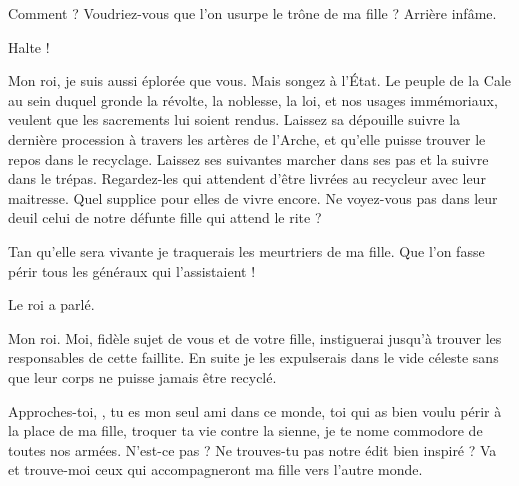 \begin{drama}
  \roispeaks Comment ? Voudriez-vous que l’on usurpe le trône de ma fille ? Arrière infâme.

  \kingsgardsspeaks {} Halte !

  \reinespeaks Mon roi, je suis aussi éplorée que vous. Mais songez à l’État. Le peuple de la Cale au sein duquel gronde la révolte, la noblesse, la loi, et nos usages immémoriaux, veulent que les sacrements lui soient rendus. Laissez sa dépouille suivre la dernière procession à travers les artères de l’Arche, et qu’elle puisse trouver le repos dans le recyclage. Laissez ses suivantes marcher dans ses pas et la suivre dans le trépas.
  Regardez-les qui attendent d’être livrées au recycleur avec leur maitresse. Quel supplice pour elles de vivre encore. Ne voyez-vous pas dans leur deuil celui de notre défunte fille qui attend le rite ?

  \roispeaks Tan qu’elle sera vivante je traquerais les meurtriers de ma fille. Que l’on fasse périr tous les généraux qui l’assistaient !

  \kingsgardsspeaks Le roi a parlé.

  \generalspeaks Mon roi. Moi, fidèle sujet de vous et de votre fille, instiguerai jusqu’à trouver les responsables de cette faillite. En suite je les expulserais dans le vide céleste sans que leur corps ne puisse jamais être recyclé.

  \roispeaks Approches-toi, \general, tu es mon seul ami dans ce monde,  toi qui as bien voulu périr à la place de ma fille, troquer ta vie contre la sienne, je te nome commodore de toutes nos armées.   N’est-ce pas \princesse ? Ne trouves-tu pas notre édit bien inspiré ?  Va et trouve-moi ceux qui accompagneront ma fille vers l’autre monde.
\end{drama}

\scene


\StageDirII{\elena, \alexas}



